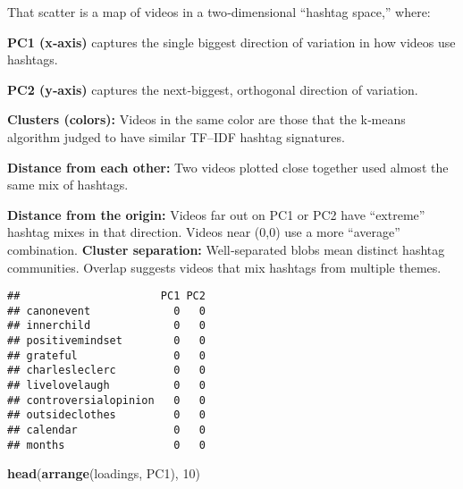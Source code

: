 \documentclass[
]{article}
\newenvironment{Shaded}{\begin{snugshade}}{\end{snugshade}}
\newcommand{\CommentTok}[1]{\textcolor[rgb]{0.56,0.35,0.01}{\textit{#1}}}
\newcommand{\DecValTok}[1]{\textcolor[rgb]{0.00,0.00,0.81}{#1}}
\newcommand{\FunctionTok}[1]{\textcolor[rgb]{0.13,0.29,0.53}{\textbf{#1}}}
\newcommand{\NormalTok}[1]{#1}
\newcommand{\OtherTok}[1]{\textcolor[rgb]{0.56,0.35,0.01}{#1}}
\newcommand{\SpecialCharTok}[1]{\textcolor[rgb]{0.81,0.36,0.00}{\textbf{#1}}}
\begin{document}
That scatter is a map of videos in a two‑dimensional ``hashtag space,''
where:

\textbf{PC1 (x‑axis)} captures the single biggest direction of variation
in how videos use hashtags.

\textbf{PC2 (y‑axis)} captures the next‑biggest, orthogonal direction of
variation.

\textbf{Clusters (colors):} Videos in the same color are those that the
k‑means algorithm judged to have similar TF--IDF hashtag signatures.

\textbf{Distance from each other:} Two videos plotted close together
used almost the same mix of hashtags.

\textbf{Distance from the origin:} Videos far out on PC1 or PC2 have
``extreme'' hashtag mixes in that direction. Videos near (0,0) use a
more ``average'' combination. \textbf{Cluster separation:}
Well‑separated blobs mean distinct hashtag communities. Overlap suggests
videos that mix hashtags from multiple themes.

\begin{Shaded}
\end{Shaded}

\begin{verbatim}
##                      PC1 PC2
## canonevent             0   0
## innerchild             0   0
## positivemindset        0   0
## grateful               0   0
## charlesleclerc         0   0
## livelovelaugh          0   0
## controversialopinion   0   0
## outsideclothes         0   0
## calendar               0   0
## months                 0   0
\end{verbatim}

\begin{Shaded}
\begin{Highlighting}[]
\FunctionTok{head}\NormalTok{(}\FunctionTok{arrange}\NormalTok{(loadings, PC1), }\DecValTok{10}\NormalTok{)}
\end{Highlighting}
\end{Shaded}
\end{document}
